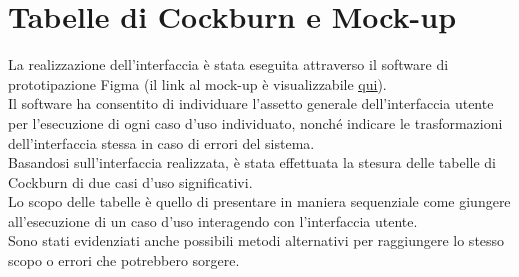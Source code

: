     \section{Tabelle di Cockburn e Mock-up}
    La realizzazione dell'interfaccia è stata eseguita attraverso il software di prototipazione Figma (il link al mock-up è visualizzabile \href{https://www.figma.com/file/kieERzm8U3jsHALXk4IjKS/Mockup?type=design&node-id=0%3A1&mode=design&t=CAyNdczd5giYLJ1j-1}{\underline{qui}}). \\
    Il software ha consentito di individuare l'assetto generale dell'interfaccia utente per l'esecuzione di ogni caso d'uso individuato, nonché indicare le trasformazioni dell'interfaccia stessa in caso di errori del sistema.\\
    Basandosi sull'interfaccia realizzata, è stata effettuata la stesura delle tabelle di Cockburn di due casi d'uso significativi. \\
    Lo scopo delle tabelle è quello di presentare in maniera sequenziale come giungere all'esecuzione di un caso d'uso interagendo con l'interfaccia utente. \\
    Sono stati evidenziati anche possibili metodi alternativi per raggiungere lo stesso scopo o errori che potrebbero sorgere.
